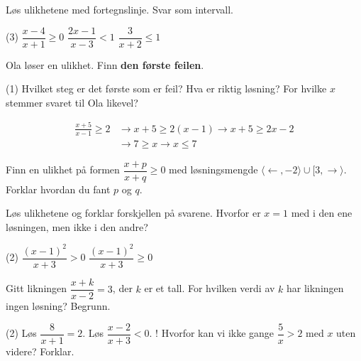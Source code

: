 Løs ulikhetene med fortegnslinje. Svar som intervall.
\begin{tasks}(3)
  \task $\dfrac{x-4}{x+1} \ge 0$
  \task $\dfrac{2x-1}{x-3} < 1$
  \task $\dfrac{3}{x+2} \le 1$
\end{tasks}

Ola løser en ulikhet. Finn \textbf{den første feilen}.
\begin{tasks}(1)
  \task Hvilket steg er det første som er feil? Hva er riktig løsning?
  \task For hvilke $x$ stemmer svaret til Ola likevel?
\end{tasks}
\begin{align*}
\frac{x+5}{x-1} \ge 2 &\longrightarrow x + 5 \ge 2(x-1) \longrightarrow x + 5 \ge 2x - 2\\
&\longrightarrow 7 \ge x \longrightarrow x \le 7
\end{align*}


Finn en ulikhet på formen $\dfrac{x+p}{x+q} \ge 0$ med løsningsmengde $\langle \leftarrow, -2\rangle \cup [3, \rightarrow\rangle$. Forklar hvordan du fant $p$ og $q$.

Løs ulikhetene og forklar forskjellen på svarene. Hvorfor er $x = 1$ med i den ene løsningen, men ikke i den andre?
\begin{tasks}(2)
  \task $\dfrac{(x-1)^2}{x+3} > 0$
  \task $\dfrac{(x-1)^2}{x+3} \ge 0$
\end{tasks}

Gitt likningen $\dfrac{x+k}{x-2} = 3$, der $k$ er et tall. For hvilken verdi av $k$ har likningen ingen løsning? Begrunn.

\begin{sjekk}
\begin{tasks}(2)
  \task Løs $\dfrac{8}{x+1} = 2$.
  \task Løs $\dfrac{x-2}{x+3} < 0$.
  \task! Hvorfor kan vi ikke gange $\dfrac{5}{x} > 2$ med $x$ uten videre? Forklar.
\end{tasks}
\end{sjekk}
